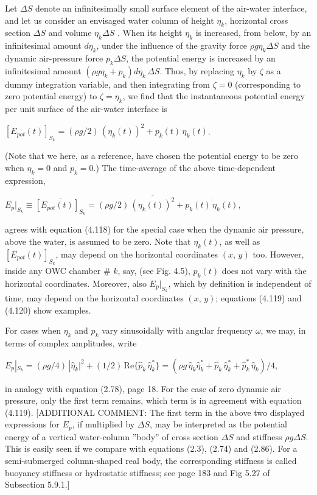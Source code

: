 \documentclass[a4paper,12pt]{article}
\begin{document}
Let $\Delta S$ denote an infinitesimally small surface element of the air-water interface, and let us consider an envisaged water column of height $\eta_k$, horizontal cross section $\Delta S$ and volume $\eta_k \Delta S$ . When its height $\eta_k$ is increased, from below, by an infinitesimal amount $d \eta_k$, under the influence of the gravity force $\rho g \eta_k \Delta S$ and the dynamic air-pressure force $p_k \Delta S$, the potential energy is increased by an infinitesimal amount $(\rho g \eta_k + p_k) d \eta_k \, \Delta S$. Thus, by replacing $\eta_k$ by $\zeta$ as a dummy integration variable, and then integrating from $\zeta = 0$ (corresponding to zero potential energy) to $\zeta = \eta_k$, we find that the instantaneous potential energy per unit surface of the air-water interface is \\
\centerline{$[E_{{pot}}(t)]_{S_k} = (\rho g /2)\, (\eta_k(t))^2 + p_k(t) \, \eta_k(t)$.}
(Note that we here, as a reference, have chosen the potential energy to be zero when $\eta_k = 0$ and $p_k = 0$.) The time-average of the above time-dependent expression, \\
\centerline{$E_p|_{S_k} \equiv \overline{[E_{{pot}}(t)]_{S_k}} = (\rho g /2)\, \overline{(\eta_k(t))^2} + \overline{p_k(t) \, \eta_k(t)}$,}
agrees with equation (4.118) for the special case when the dynamic air pressure, above the water, is assumed to be zero. Note that $\eta_k(t)$, as well as $[E_{{pot}}(t)]_{S_k}$, may depend on the horizontal coordinates $(x,\, y)$ too. However, inside any OWC chamber \# $k$, say, (see Fig. 4.5), $p_k(t)$ does not vary with the horizontal coordinates. Moreover, also $E_p|_{S_k}$, which by definition is independent of time, may depend on the horizontal coordinates $(x,\, y)$; equations (4.119) and (4.120) show examples.

For cases when $\eta_k$ and $p_k$ vary sinusoidally with angular frequency $\omega$, we may, in terms of complex amplitudes, write \\
\centerline{$E_p|_{S_k}  = (\rho g /4)\, |\hat{\eta}_k|^2 + (1/2)\, \mbox{Re}\{\hat{p}_k \, \hat{\eta}_k^*\}
  = (\rho g\, \hat{\eta}_k \hat{\eta}_k^* + \hat{p}_k \, \hat{\eta}_k^* + \hat{p}_k^* \, \hat{\eta}_k)/4$,}
in analogy with equation (2.78), page 18. For the case of zero dynamic air pressure, only the first term remains, which term is in agreement with equation (4.119). [ADDITIONAL COMMENT: The first term in the above two displayed expressions for $E_p$, if multiplied by $\Delta S$, may be interpreted as the potential energy of a vertical water-column ''body'' of cross section $\Delta S$ and stiffness $\rho g \Delta S$. This is easily seen if we compare with equations (2.3), (2.74) and (2.86). For a semi-submerged column-shaped real body, the corresponding stiffness is called buoyancy stiffness or hydrostatic stiffness; see page 183 and Fig 5.27 of Subsection 5.9.1.]
\end{document}
